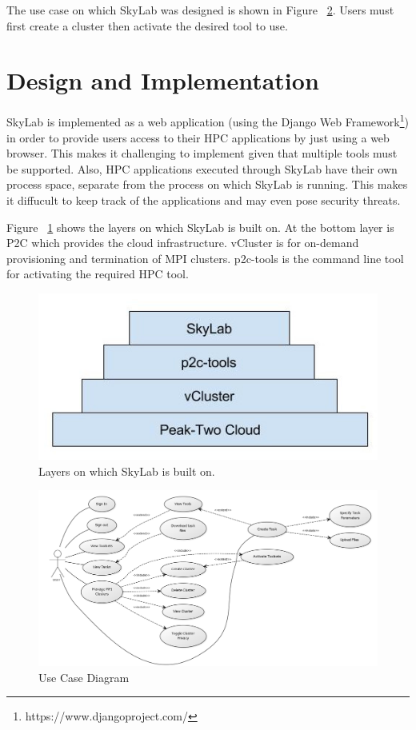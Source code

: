 The use case on which SkyLab was designed is shown in Figure ~\ref{fig:usecase}. Users must first create a cluster then activate the desired tool to use.
      
\section{Design and Implementation}

SkyLab is implemented as a web application (using the Django Web Framework\footnote{https://www.djangoproject.com/}) in order to provide users access to their HPC applications by just using a web browser. This makes it challenging to implement given that multiple tools must be supported. Also, HPC applications executed through SkyLab have their own process space, separate from the process on which SkyLab is running. This makes it diffucult to keep track of the applications and may even pose security threats. 

Figure ~\ref{fig:sysarch} shows the layers on which SkyLab is built on. At the bottom layer is P2C which provides the cloud infrastructure. vCluster is for on-demand provisioning and termination of MPI clusters. p2c-tools is the command line tool for activating the required HPC tool.

	\begin{figure}[h]			
		\includegraphics[scale=0.30]{./images/skylab_layers.jpg}			
		\caption{\label{fig:sysarch}Layers on which SkyLab is built on.}	
	\end{figure}	


    \begin{figure}[ht]
      \centering
      \includegraphics[scale=0.36]{./images/use_case_large.png}
      \caption{\label{fig:usecase}Use Case Diagram}
    \end{figure}

